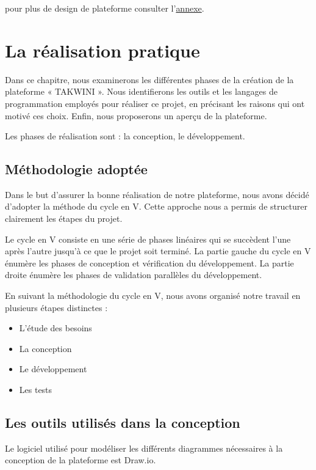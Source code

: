 \documentclass{article}
\begin{document}
  pour plus de design de plateforme consulter l'\hyperref[annexe-design]{annexe}.


  \newpage
\section{La réalisation pratique}


\hspace*{2em}Dans ce chapitre, nous examinerons les différentes phases de la création de la plateforme « TAKWINI ». Nous identifierons les outils et les langages de programmation employés pour réaliser ce projet, en précisant les raisons qui ont motivé ces choix. Enfin, nous proposerons un aperçu de la plateforme.

\noindent Les phases de réalisation sont : la conception, le développement.
\subsection{Méthodologie adoptée}

\hspace*{2em}Dans le but d'assurer la bonne réalisation de notre plateforme, nous avons décidé d'adopter la méthode du cycle en V. Cette approche nous a permis de structurer clairement les étapes du projet.

\noindent Le cycle en V consiste en une série de phases linéaires qui se succèdent l'une après l'autre jusqu'à ce que le projet soit terminé. La partie gauche du cycle en V énumère les phases de conception et vérification du développement. La partie droite énumère les phases de validation parallèles du développement.\cite{cycleV}

\noindent En suivant la méthodologie du cycle en V, nous avons organisé notre travail en plusieurs étapes distinctes :
\begin{itemize}
    \item L’étude des besoins 
    \item La conception
    \item Le développement
    \item Les tests
\end{itemize}

\subsection{Les outils utilisés dans la conception}
Le logiciel utilisé pour modéliser les différents diagrammes nécessaires à la conception de la plateforme est Draw.io.
\end{document}
